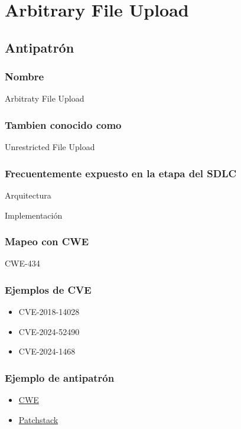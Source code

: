 \chapter{Arbitrary File Upload}
\section{Antipatrón}
\subsection*{Nombre}
Arbitraty File Upload
\subsection*{Tambien conocido como}
Unrestricted File Upload

\subsection*{Frecuentemente expuesto en la etapa del SDLC}
Arquitectura

Implementación
\subsection*{Mapeo con CWE}
CWE-434
\subsection*{Ejemplos de CVE}
\begin{itemize}
    \item CVE-2018-14028
    \item CVE-2024-52490
    \item CVE-2024-1468
\end{itemize}

\subsection*{Ejemplo de antipatrón}
\begin{itemize}
    \item \href{https://cwe.mitre.org/data/definitions/434.html}{CWE}
    \item \href{https://patchstack.com/academy/wordpress/vulnerabilities/arbitrary-file-upload/}{Patchstack}
\end{itemize}
